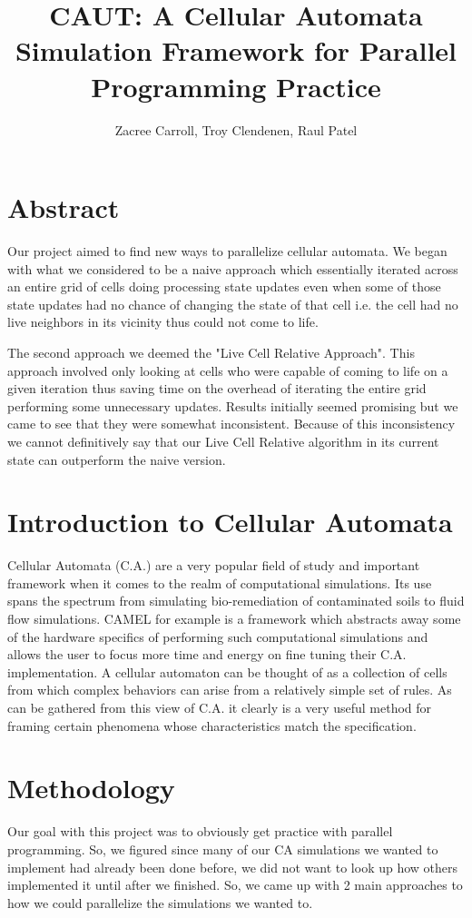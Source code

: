 \documentclass[12pt]{article}
\begin{document}
\title{CAUT: A Cellular Automata Simulation Framework for Parallel Programming Practice}
\author{Zacree Carroll, Troy Clendenen, Raul Patel}
\maketitle

\section{Abstract}
Our project aimed to find new ways to parallelize cellular automata. We began with what we considered to be a naive approach which essentially iterated across an entire grid of cells doing processing state updates even when some of those state updates had no chance of changing the state of that cell i.e. the cell had no live neighbors in its vicinity thus could not come to life. 
\par
The second approach we deemed the "Live Cell Relative Approach". This approach involved only looking at cells who were capable of coming to life on a given iteration thus saving time on the overhead of iterating the entire grid performing some unnecessary updates. Results initially seemed promising but we came to see that they were somewhat inconsistent. Because of this inconsistency we cannot definitively say that our Live Cell Relative algorithm in its current state can outperform the naive version.

\section{Introduction to Cellular Automata}
Cellular Automata (C.A.) are a very popular field of study and important framework when it comes to the realm of computational simulations. Its use spans the spectrum from simulating bio-remediation of contaminated soils to fluid flow simulations. CAMEL for example is a framework which abstracts away some of the hardware specifics of performing such computational simulations and allows the user to focus more time and energy on fine tuning their C.A. implementation. \cite{Cann95} A cellular automaton can be thought of as a collection of cells from which complex behaviors can arise from a relatively simple set of rules. As can be gathered from this view of C.A. it clearly is a very useful method for framing certain phenomena whose characteristics match the specification.

\section{Methodology}
Our goal with this project was to obviously get practice with parallel programming. So, we figured since many of our CA simulations we wanted to implement had already been done before, we did not want to look up how others implemented it until after we finished. So, we came up with 2 main approaches to how we could parallelize the simulations we wanted to.
\end{document}
